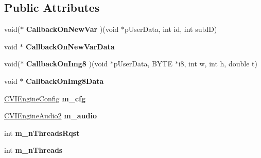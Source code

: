\subsection*{Public Attributes}
\begin{DoxyCompactItemize}
\item 
\hypertarget{class_c_v_i_engine_base_ab3883b66e78478803c693b4ad2f5b0e7}{void($\ast$ {\bfseries Callback\+On\+New\+Var} )(void $\ast$p\+User\+Data, int id, int sub\+I\+D)}\label{class_c_v_i_engine_base_ab3883b66e78478803c693b4ad2f5b0e7}

\item 
\hypertarget{class_c_v_i_engine_base_aa0d4e70811444be165a4b9c2a4aa7aae}{void $\ast$ {\bfseries Callback\+On\+New\+Var\+Data}}\label{class_c_v_i_engine_base_aa0d4e70811444be165a4b9c2a4aa7aae}

\item 
\hypertarget{class_c_v_i_engine_base_a4f0ddf3af6a98c243d97cbcc9be38e18}{void($\ast$ {\bfseries Callback\+On\+Img8} )(void $\ast$p\+User\+Data, B\+Y\+T\+E $\ast$i8, int w, int h, double t)}\label{class_c_v_i_engine_base_a4f0ddf3af6a98c243d97cbcc9be38e18}

\item 
\hypertarget{class_c_v_i_engine_base_abfaf1ec8dec9a82c896a90c708dfd756}{void $\ast$ {\bfseries Callback\+On\+Img8\+Data}}\label{class_c_v_i_engine_base_abfaf1ec8dec9a82c896a90c708dfd756}

\item 
\hypertarget{class_c_v_i_engine_base_a867f7342010985b0b21beb4feaf354b8}{\hyperlink{class_c_v_i_engine_config}{C\+V\+I\+Engine\+Config} {\bfseries m\+\_\+cfg}}\label{class_c_v_i_engine_base_a867f7342010985b0b21beb4feaf354b8}

\item 
\hypertarget{class_c_v_i_engine_base_af996670eec8597e3529bfd0a2ec2585e}{\hyperlink{class_c_v_i_engine_audio2}{C\+V\+I\+Engine\+Audio2} {\bfseries m\+\_\+audio}}\label{class_c_v_i_engine_base_af996670eec8597e3529bfd0a2ec2585e}

\item 
\hypertarget{class_c_v_i_engine_base_a36e1cc3cb814a08af53e9b4076b51dae}{int {\bfseries m\+\_\+n\+Threads\+Rqst}}\label{class_c_v_i_engine_base_a36e1cc3cb814a08af53e9b4076b51dae}

\item 
\hypertarget{class_c_v_i_engine_base_a0041ab05a40ba6a0bca65c78ea9d8189}{int {\bfseries m\+\_\+n\+Threads}}\label{class_c_v_i_engine_base_a0041ab05a40ba6a0bca65c78ea9d8189}


\end{DoxyCompactItemize}
